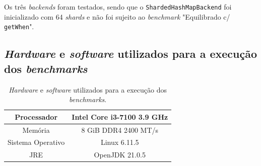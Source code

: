 \documentclass[11pt, a4paper]{article}
\begin{document}

Os três \emph{backends} foram testados, sendo que o \texttt{ShardedHashMapBackend} foi inicializado
com 64 \emph{shards} e não foi sujeito ao \emph{benchmark} "Equilibrado c/ \texttt{getWhen}"{}.

\subsection{\emph{Hardware} e \emph{software} utilizados para a execução dos \emph{benchmarks}}
\label{hardware-software-description}

\begin{table}[H]
    \begin{center}
        \begin{tabular}{|c|c|}
            \hline Processador       & Intel Core i3-7100 3.9 GHz  \\
            \hline Memória           & 8 GiB DDR4 2400 MT/s        \\
            \hline Sistema Operativo & Linux 6.11.5                \\
            \hline JRE               & OpenJDK 21.0.5              \\
            \hline
        \end{tabular}
    \end{center}

    \caption{\emph{Hardware} e \emph{software} utilizados para a execução dos \emph{benchmarks}.}
    \label{hardware-software}
\end{table}
\end{document}
